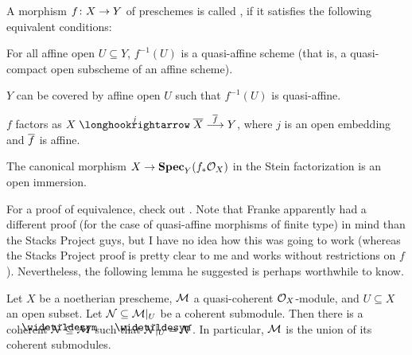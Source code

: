 \documentclass[a4paper,parskip=half,numbers=enddot, DIV=12]{scrreprt}
\begin{document}
\begin{defi}
	A morphism $f\colon X\morphism Y$ of preschemes is called , if it satisfies the following equivalent conditions:
	\begin{alphanumerate}
		\item For all affine open $U\subseteq Y$, $f^{-1}(U)$ is a quasi-affine scheme (that is, a quasi-compact open subscheme of an affine scheme).
		\item $Y$ can be covered by affine open $U$ such that $f^{-1}(U)$ is quasi-affine.
		\item $f$ factors as $X\monomorphism[j]\ov{X}\morphism[\smash{\ov{f}}]Y$, where $j$ is an open embedding and $\overline{f}$ is affine.
		\item The canonical morphism $X\morphism\SPEC_Y(f_*\Oo_X)$ in the Stein factorization is an open immersion.
	\end{alphanumerate}
\end{defi}
For a proof of equivalence, check out \cite[]{stacks-project}. Note that Franke apparently had a different proof (for the case of quasi-affine morphisms of finite type) in mind than the Stacks Project guys, but I have no idea how this was going to work (whereas the Stacks Project proof is pretty clear to me and works without restrictions on $f$). Nevertheless, the following lemma he suggested is perhaps worthwhile to know.
\begin{lem}
	Let $X$ be a noetherian prescheme, $\mathcal{M}$ a quasi-coherent $\mathcal{O}_X$-module, and $U\subseteq X$ an open subset. Let $\mathcal{N}\subseteq \mathcal{M}|_U$ be a coherent submodule. Then there is a coherent $\snake{\Nn}\subseteq \Mm$ such that $\snake{\Nn}|_U=\Nn$. In particular, $\mathcal{M}$ is the union of its coherent submodules.
\end{lem}
\end{document}
